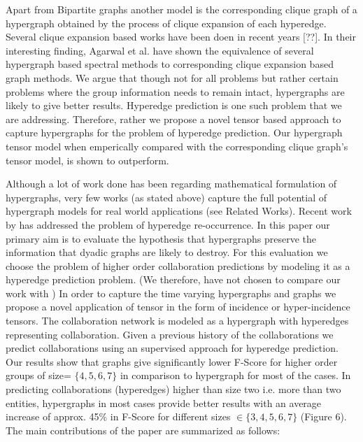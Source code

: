 \documentclass{sig-alternate}
\begin{document}
Apart from Bipartite graphs another model is the corresponding clique graph of a hypergraph obtained by the process of clique expansion of each hyperedge. Several clique expansion based works have been doen in recent years [??]. In their interesting finding, Agarwal et al.\cite{agarwal2008} have shown the equivalence of several hypergraph based spectral methods to corresponding clique expansion based graph methods. We argue that though not for all problems but rather certain problems where the group information needs to remain intact, hypergraphs are likely to give better results. Hyperedge prediction is one such problem that we are addressing. Therefore, rather we propose a novel tensor based approach to capture hypergraphs for the problem of hyperedge prediction. Our hypergraph tensor model when emperically compared with the corresponding clique graph's tensor model, is shown to outperform.




Although a lot of work done has been regarding mathematical formulation of hypergraphs, very few works (as stated above) capture the full potential of hypergraph models for real world applications (see Related Works). Recent work by \cite{latent2013} has addressed the problem of hyperedge re-occurrence. In this paper our primary aim is to evaluate the hypothesis that hypergraphs preserve the information that dyadic graphs are likely to destroy. For this evaluation we choose the problem of higher order collaboration predictions by modeling it as a hyperedge prediction problem. (We therefore, have not chosen to compare our work with \cite{latent2013}) In order to capture the time varying hypergraphs and graphs we propose a novel application of tensor in the form of incidence or hyper-incidence tensors. The collaboration network is modeled as a hypergraph with hyperedges representing collaboration. Given a previous history of the collaborations we predict collaborations using an supervised approach for hyperedge prediction. Our results show that graphs give significantly lower F-Score for higher order groups of size= $\{4,5,6,7\}$ in comparison to hypergraph for most of the cases. In predicting collaborations (hyperedges) higher than size two i.e. more than two entities, hypergraphs in most cases provide better results with an average increase of approx. 45\% in F-Score for different sizes $\in \{3,4,5,6,7\}$ (Figure 6). The main contributions of the paper are summarized as follows:
\end{document}
